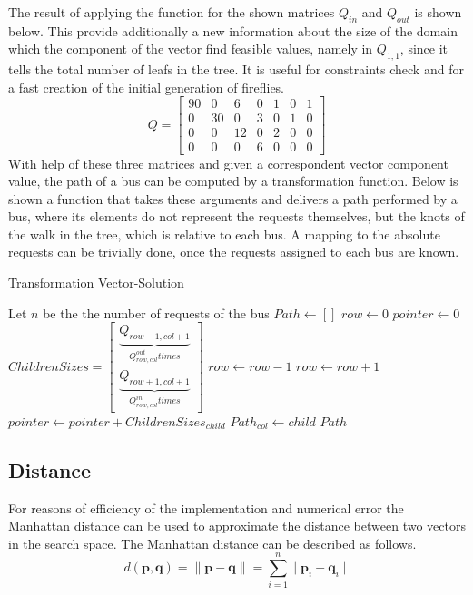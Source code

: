 \documentclass[tuberlin,cic,tc,openright,english,noabntcite,oneside]{iiufrgs}
\begin{document}
The result of applying the function for the shown matrices $Q_{in}$ and $Q_{out}$ is shown below. This provide additionally a new information about the size of the domain which the component of the vector find feasible values, namely in $Q_{1,1}$, since it tells the total number of leafs in the tree. It is useful for constraints check and for a fast creation of the initial generation of fireflies.
$$
Q = 
\begin{bmatrix}
90 & 0 & 6 & 0 & 1 & 0 & 1\\
0 & 30 & 0 & 3 & 0 & 1 & 0\\
0 & 0 & 12 & 0 & 2 & 0 & 0\\
0 & 0 & 0 & 6 & 0 & 0 & 0
\end{bmatrix}
$$
With help of these three matrices and given a correspondent vector component value, the path of a bus can be computed by a transformation function. Below is shown a function that takes these arguments and delivers a path performed by a bus, where its elements do not represent the requests themselves, but the knots of the walk in the tree, which is relative to each bus. A mapping to the absolute requests can be trivially done, once the requests assigned to each bus are known.
\begin{algorithm}[H]
\caption{Transformation Vector-Solution}
\begin{algorithmic}
\State Let $n$ be the the number of requests of the bus
\State $Path \gets [ ]$
\State $row \gets 0$
\State $pointer \gets 0$
	\State $\displaystyle ChildrenSizes = \begin{bmatrix}\underbrace{Q_{row-1,col+1}}_{Q^{out}_{row,col} times}
			\\ \underbrace{Q_{row+1,col+1}}_{Q^{in}_{row,col} times}\end{bmatrix}$
				\State $row \gets row - 1$
			\Else
				\State $row \gets row + 1$
			\EndIf
		\Else
			\State $pointer \gets pointer + ChildrenSizes_{child}$
		\EndIf
	\EndFor
	\State $Path_{col} \gets child$
\EndFor
\State \Return $Path$
\EndFunction
\end{algorithmic}
\end{algorithm}

\subsection{Distance}
For reasons of efficiency of the implementation and numerical error the Manhattan distance can be used to approximate the distance between two vectors in the search space. The Manhattan distance can be described as follows.
$$d(\mathbf{p},\mathbf{q}) = \parallel \mathbf{p} - \mathbf{q} \parallel = \sum_{i=1}^{n} \mid \mathbf{p}_{i}-\mathbf{q}_{i} \mid$$
\end{document}
